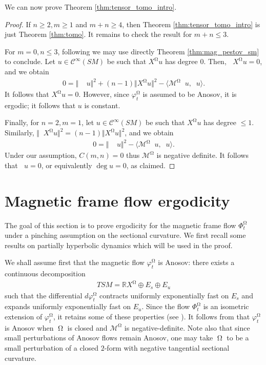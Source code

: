 \documentclass[12pt]{amsart}
\numberwithin{numbering}{section}
\theoremstyle{plain}
\theoremstyle{definition}
\theoremstyle{remark}
\numberwithin{equation}{section}
\DeclareMathOperator{\nv}{\nabla_{\mathbb{V}}}
\DeclareMathOperator{\xs}{\mathbb{X}^{\mg}}
\DeclareMathOperator{\mg}{\Omega}
\newcommand{\R}{\mathbb{R}}
\begin{document}
We can now prove Theorem \ref{thm:tensor_tomo_intro}.

\begin{proof}
If $n \geq 2, m \geq 1$ and $m + n \geq 4$, then Theorem \ref{thm:tensor_tomo_intro} is just Theorem \ref{thm:tomo}. It remains to check the result for $m + n \leq 3$.

\smallskip 

For $m = 0, n \leq 3$, following \cite[Theorem 16.1.2]{lefeuvre2024microlocal} we may use directly Theorem \ref{thm:mag_pestov_sm} to conclude. Let $u \in \mathcal{C}^\infty(SM)$ be such that $X^{\mg} u$ has degree $0$. Then, $\nv X^{\mg} u = 0$, and we obtain 
\begin{align*}
0 = \Vert \xs \nv u \Vert^2 + (n-1) \Vert X^{\mg} u \Vert^2 - \langle \mathcal{M}^{\mg} \nv u, \nv u \rangle.
\end{align*}
It follows that $X^{\mg} u = 0$. However, since $\varphi_t^{\mg}$ is assumed to be Anosov, it is ergodic; it follows that $u$ is constant. 

\smallskip

Finally, for $n = 2, m = 1$, let $u \in \mathcal{C}^\infty(SM)$ be such that $X^{\mg} u$ has degree $\leq 1$. Similarly, $\Vert \nv X^{\mg} u \Vert^2 = (n-1) \Vert X^{\mg} u \Vert^2$, and we obtain 
\begin{align*}
0 = \Vert \xs \nv u \Vert^2 - \langle \mathcal{M}^{\mg} \nv u, \nv u \rangle.
\end{align*}
Under our assumption, $C(m, n) = 0$ thus $\mathcal{M}^{\mg}$ is negative definite. It follows that $\nv u = 0$, or equivalently $\deg u = 0$, as claimed.
\end{proof}


\section{Magnetic frame flow ergodicity} \label{sec:ergodicity}

The goal of this section is to prove ergodicity for the magnetic frame flow $\Phi_t^{\mg}$ under a pinching assumption on the sectional curvature. We first recall some results on partially hyperbolic dynamics which will be used in the proof.

We shall assume first that the magnetic flow $\varphi_t^{\mg}$ is Anosov: there exists a continuous decomposition 
\begin{align*}
TSM = \R X^{\mg} \oplus E_s \oplus E_u
\end{align*}
such that the differential $d\varphi_t^{\mg}$ contracts uniformly exponentially fast on $E_s$ and expands uniformly exponentially fast on $E_u$. Since the flow $\Phi_t^{\mg}$ is an isometric extension of $\varphi_t^{\mg}$, it retains some of these properties (see \cite[Chapter 12]{lefeuvre2024microlocal}). It follows from \cite[Appendix A]{assenza2025hopf} that $\varphi_t^{\mg}$ is Anosov when $\mg$ is closed and $\mathcal{M}^{\mg}$ is negative-definite. Note also that since small perturbations of Anosov flows remain Anosov, one may take $\mg$ to be a small perturbation of a closed $2$-form with negative tangential sectional curvature.
\end{document}
